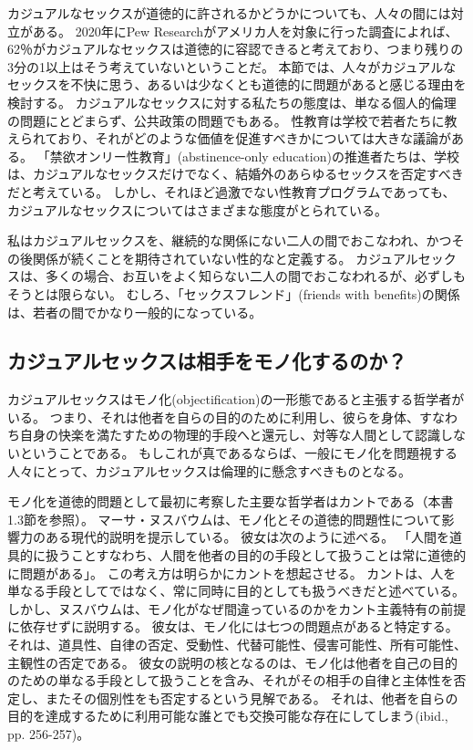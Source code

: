 \documentclass[paper=a4,book,openany]{jlreq} \usepackage{mystyle}
\begin{document}
カジュアルなセックスが道徳的に許されるかどうかについても、人々の間には対立がある。
2020年にPew Researchがアメリカ人を対象に行った調査によれば、62％がカジュアルなセックスは道徳的に容認できると考えており、つまり残りの3分の1以上はそう考えていないということだ\citep{brow20:_near_half_u}。
本節では、人々がカジュアルなセックスを不快に思う、あるいは少なくとも道徳的に問題があると感じる理由を検討する。
カジュアルなセックスに対する私たちの態度は、単なる個人的倫理の問題にとどまらず、公共政策の問題でもある。
性教育は学校で若者たちに教えられており、それがどのような価値を促進すべきかについては大きな議論がある。
「禁欲オンリー性教育」(abstinence-only education)の推進者たちは、学校は、カジュアルなセックスだけでなく、結婚外のあらゆるセックスを否定すべきだと考えている。
しかし、それほど過激でない性教育プログラムであっても、カジュアルなセックスについてはさまざまな態度がとられている。

私はカジュアルセックスを、継続的な関係にない二人の間でおこなわれ、かつその後関係が続くことを期待されていない性的なと定義する。
カジュアルセックスは、多くの場合、お互いをよく知らない二人の間でおこなわれるが、必ずしもそうとは限らない。
むしろ、「セックスフレンド」(friends with benefits)の関係は、若者の間でかなり一般的になっている\citep{dube17:_why_frien_benef}。

\subsection{カジュアルセックスは相手をモノ化するのか？}

カジュアルセックスはモノ化(objectification)の一形態であると主張する哲学者がいる。
つまり、それは他者を自らの目的のために利用し、彼らを身体、すなわち自身の快楽を満たすための物理的手段へと還元し、対等な人間として認識しないということである。
もしこれが真であるならば、一般にモノ化を問題視する人々にとって、カジュアルセックスは倫理的に懸念すべきものとなる。

モノ化を道徳的問題として最初に考察した主要な哲学者はカントである（本書1.3節を参照）。
マーサ・ヌスバウムは、モノ化とその道徳的問題性について影響力のある現代的説明を提示している。
彼女は次のように述べる。
「人間を道具的に扱うこと{\DDASH}すなわち、人間を他者の目的の手段として扱うこと{\DDASH}は常に道徳的に問題がある」\citep[p.289]{nussbaum95:_objec}。
この考え方は明らかにカントを想起させる。
カントは、人を単なる手段としてではなく、常に同時に目的としても扱うべきだと述べている。
しかし、ヌスバウムは、モノ化がなぜ間違っているのかをカント主義特有の前提に依存せずに説明する。
彼女は、モノ化には七つの問題点があると特定する。
それは、道具性、自律の否定、受動性、代替可能性、侵害可能性、所有可能性、主観性の否定である。
彼女の説明の核となるのは、モノ化は他者を自己の目的のための単なる手段として扱うことを含み、それがその相手の自律と主体性を否定し、またその個別性をも否定するという見解である。
それは、他者を自らの目的を達成するために利用可能な誰とでも交換可能な存在にしてしまう(ibid., pp. 256-257)。
\end{document}
